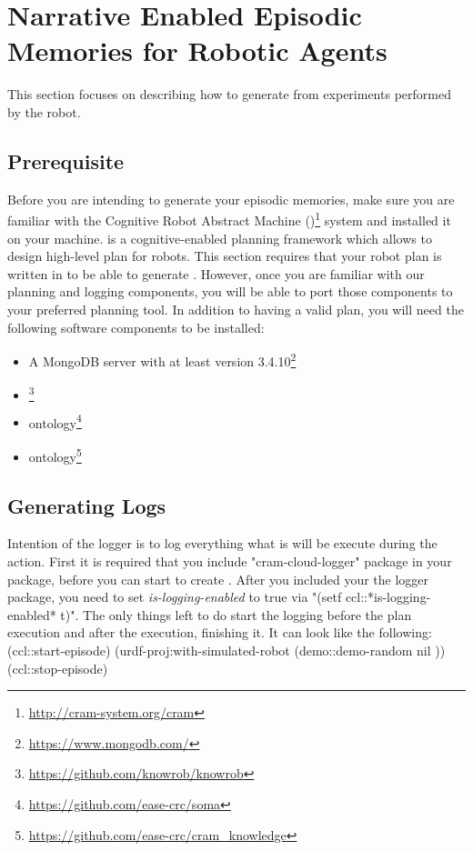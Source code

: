 \section{Narrative Enabled Episodic Memories for Robotic Agents}
\label{sec:robot-neem}
This section focuses on describing how to generate \neems from experiments performed by the robot. 

\subsection{Prerequisite}

Before you are intending to generate your episodic memories, make sure you are familiar with the Cognitive Robot Abstract Machine (\cram)\footnote{\url{http://cram-system.org/cram}} system and installed it on your machine.
\cram is a cognitive-enabled planning framework which allows to design high-level plan for robots.
This section requires that your robot plan is written in \cram to be able to generate \neems.
However, once you are familiar with our planning and logging components, you will be able to port those components to your preferred planning tool.
In addition to having a valid \cram plan, you will need the following software components to be installed:
\begin{itemize}
	\item A MongoDB server with at least version 3.4.10\footnote{\url{https://www.mongodb.com/}}
	\item \knowrob\footnote{\url{https://github.com/knowrob/knowrob}}
	\item \soma ontology\footnote{\url{https://github.com/ease-crc/soma}}
	\item \cram ontology\footnote{\url{https://github.com/ease-crc/cram\_knowledge}}
\end{itemize}


\subsection{Generating Logs}
Intention of the logger is to log everything what is will be execute during the \cram action.
First it is required that you include "cram-cloud-logger" package in your \cram package, before you can start to create \neems.
After you included your the logger package, you need to set \textit{is-logging-enabled} to true via "(setf ccl::*is-logging-enabled* t)".
The only things left to do start the logging before the plan execution and after the execution, finishing it.
It can look like the following:
	(ccl::start-episode)
	(urdf-proj:with-simulated-robot (demo::demo-random nil ))
	(ccl::stop-episode)
	

